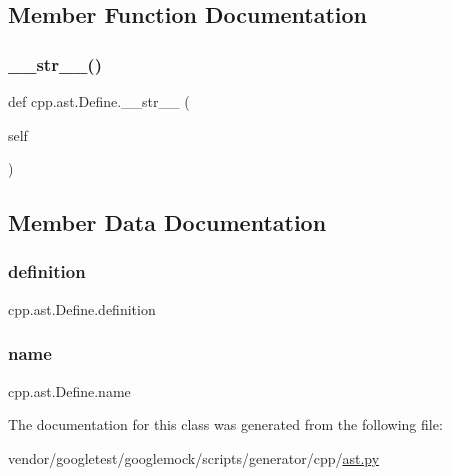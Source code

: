 \subsection{Member Function Documentation}
\mbox{\label{classcpp_1_1ast_1_1_define_aa89732914b19901c8d291e11f34bb627}} 
\subsubsection{\texorpdfstring{\+\_\+\+\_\+str\+\_\+\+\_\+()}{\_\_str\_\_()}}
{\footnotesize\ttfamily def cpp.\+ast.\+Define.\+\_\+\+\_\+str\+\_\+\+\_\+ (\begin{DoxyParamCaption}\item[{}]{self }\end{DoxyParamCaption})}



\subsection{Member Data Documentation}
\mbox{\label{classcpp_1_1ast_1_1_define_a0c636652dfeb2f15e62793afea1153c9}} 
\subsubsection{\texorpdfstring{definition}{definition}}
{\footnotesize\ttfamily cpp.\+ast.\+Define.\+definition}

\mbox{\label{classcpp_1_1ast_1_1_define_a8879216f09e88f79d7baa49bcfa10ebd}} 
\subsubsection{\texorpdfstring{name}{name}}
{\footnotesize\ttfamily cpp.\+ast.\+Define.\+name}



The documentation for this class was generated from the following file\+:\begin{DoxyCompactItemize}
\item 
vendor/googletest/googlemock/scripts/generator/cpp/\hyperlink{ast_8py}{ast.\+py}\end{DoxyCompactItemize}
